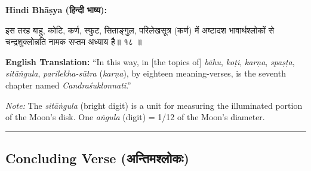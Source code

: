 \documentclass[11pt,a4paper]{article}
\newcommand{\dev}[1]{{\devanagarifont #1}}
\newenvironment{sanskritverse}{%
  \begin{center}\begin{minipage}{0.95\textwidth}
  \setlength{\leftskip}{1em}
  \setlength{\rightskip}{1em}
  \dev
}{\end{minipage}\end{center}}
\newenvironment{paracol}[1]{\begingroup}{\endgroup}
\newcommand{\switchcolumn}[1][]{%
  \ifnum#1=0\relax\else\par\nobreak\vspace{0.5em}\par\nobreak\fi%
}
\begin{document}
\vspace{0.5em}

\begin{paracol}{2}

\noindent\textbf{Hindi Bhāṣya (\dev{हिन्दी भाष्य}):}
\begin{sanskritverse}
इस तरह बाहु, कोटि, कर्ण, स्फुट, सिताङ्गुल, परिलेखसूत्र (कर्ण) में अष्टादश
भावार्थश्लोकों से चन्द्रशुक्लोन्नति नामक सप्तम अध्याय है॥ १८ ॥
\end{sanskritverse}

\switchcolumn

\textbf{English Translation:} ``In this way, in [the topics of] \textit{bāhu}, \textit{koṭi}, \textit{karṇa}, \textit{spaṣṭa}, \textit{sitāṅgula}, \textit{parilekha-sūtra} (\textit{karṇa}), by eighteen meaning-verses, is the seventh chapter named \textit{Candraśuklonnati}.''

\textit{Note:} The \textit{sitāṅgula} (bright digit) is a unit for measuring the illuminated portion of the Moon's disk. One \textit{aṅgula} (digit) = 1/12 of the Moon's diameter.

\end{paracol}

\vspace{1em}
\begin{center}
\textcolor{rulecolor}{\rule{0.8\textwidth}{0.5pt}}
\end{center}

\subsection*{Concluding Verse ({\devanagarifont अन्तिमश्लोकः})}
\end{document}
